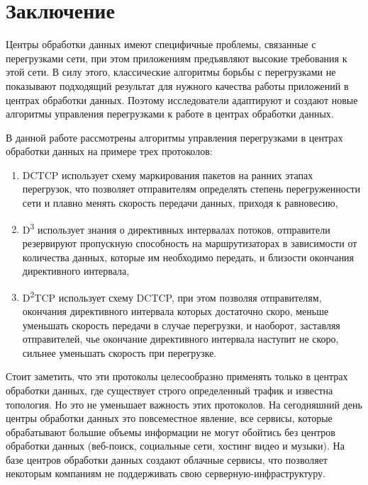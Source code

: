 \documentclass[14pt, a4paper,oneside]{extarticle}
\begin{document}
\section{Заключение}

Центры обработки данных имеют специфичные проблемы, связанные с перегрузками сети, при этом приложениям предъявляют высокие требования к этой сети. В силу этого, классические алгоритмы борьбы с перегрузками не показывают подходящий результат для нужного качества работы приложений в центрах обработки данных. Поэтому исследователи адаптируют и создают новые алгоритмы управления перегрузками к работе в центрах обработки данных.

В данной работе рассмотрены алгоритмы управления перегрузками в центрах обработки данных на примере трех протоколов:
\begin{enumerate}
\item DCTCP использует схему маркирования пакетов на ранних этапах перегрузок, что позволяет отправителям определять степень перегруженности сети и плавно менять скорость передачи данных, приходя к равновесию,
\item D\textsuperscript{3} использует знания о директивных интервалах потоков, отправители резервируют пропускную способность на маршрутизаторах в зависимости от количества данных, которые им необходимо передать, и близости окончания директивного интервала,
\item D\textsuperscript{2}TCP использует схему DCTCP, при этом позволяя отправителям, окончания директивного интервала которых достаточно скоро, меньше уменьшать скорость передачи в случае перегрузки, и наоборот, заставляя отправителей, чье окончание директивного интервала наступит не скоро, сильнее уменьшать скорость при перегрузке. 
\end{enumerate}

Стоит заметить, что эти протоколы целесообразно применять только в центрах обработки данных, где существует строго определенный трафик и известна топология. Но это не уменьшает важность этих протоколов. На сегодняшний день центры обработки данных это повсеместное явление, все сервисы, которые обрабатывают большие объемы информации не могут обойтись без центров обработки данных (веб-поиск, социальные сети, хостинг видео и музыки). На базе центров обработки данных создают облачные сервисы, что позволяет некоторым компаниям не поддерживать свою серверную-инфраструктуру.
\end{document}
